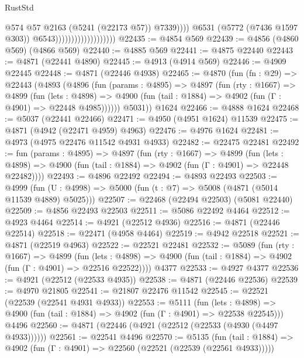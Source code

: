 \begin{lexlean}{RustStd}
\begin{coremodule}
{\begin{coremodule}
{{{{{{{{{{{{{{{{{{{{{{{{{{{{{                                                  @574
                                                  @57
                                                  @2163
                                                  (@5241 (@22173 @57))
                                                  @7339))))
                                          @6531
                                          (@5772 (@7436 @1597 @303))
                                          @6543)))))))))))))))))))
@22435 := @4854 @569
@22439 := @4856 (@4860 @569) (@4866 @569)
@22440 := @4885 @569
@22441 := @4875 @22440
@22443 := @4871 (@22441 @4890)
@22445 := @4913 (@4914 @569)
@22446 := @4909 @22445
@22448 := @4871 (@22446 @4938)
@22465 := @4870
    (fun (fn : @29) =>
    @22443
      (@4893
        (@4896
          (fun (params : @4895) =>
          @4897
            (fun (rty : @1667) =>
            @4899
              (fun (lets : @4898) =>
              @4900 (fun (tail : @1884) => @4902 (fun (Γ : @4901) => @22448 @4985))))))
        @5031))
    @1624
@22466 := @4888 @1624
@22468 := @5037 (@22441 @22466)
@22471 := @4950 (@4951 @1624) @11539
@22475 := @4871 (@4942 (@22471 @4959) @4963)
@22476 := @4976 @1624
@22481 := @4973 (@4975 @22476 @11542 @4931 @4933)
@22482 := @22475 @22481
@22492 := fun (params : @4895) =>
  @4897
    (fun (rty : @1667) =>
    @4899
      (fun (lets : @4898) =>
      @4900 (fun (tail : @1884) => @4902 (fun (Γ : @4901) => @22448 @22482))))
@22493 := @4896 @22492
@22494 := @4893 @22493
@22503 := @4999
    (fun (U : @4998) => @5000 (fun (t : @7) => @5008 (@4871 (@5014 @11539 @4889) @5025)))
@22507 := @22468 (@22494 @22503) (@5081 @22440)
@22509 := @4856 @22493 @22503
@22511 := @5086 @22492 @4464
@22512 := @4923 @4464
@22514 := @4921 (@22512 @4936)
@22516 := @4871 (@22446 @22514)
@22518 := @22471 (@4958 @4464)
@22519 := @4942 @22518
@22521 := @4871 (@22519 @4963)
@22522 := @22521 @22481
@22532 := @5089
    (fun (rty : @1667) =>
    @4899
      (fun (lets : @4898) =>
      @4900 (fun (tail : @1884) => @4902 (fun (Γ : @4901) => @22516 @22522))))
    @4377
@22533 := @4927 @4377
@22536 := @4921 (@22512 (@22533 @4935))
@22538 := @4871 (@22446 @22536)
@22539 := @4970 @21805
@22541 := @21807 @22476 @11542
@22545 := @22521 (@22539 (@22541 @4931 @4933))
@22553 := @5111
    (fun (lets : @4898) => @4900 (fun (tail : @1884) => @4902 (fun (Γ : @4901) => @22538 @22545)))
    @4496
@22560 := @4871 (@22446 (@4921 (@22512 (@22533 (@4930 (@4497 @4933))))))
@22561 := @22541 @4496
@22570 := @5135
    (fun (tail : @1884) => @4902 (fun (Γ : @4901) => @22560 (@22521 (@22539 (@22561 @4933)))))
}}}}}}}}}}}}}}}}}}}}}}}}}}}}}
\end{coremodule}}
\end{coremodule}
\end{lexlean}
